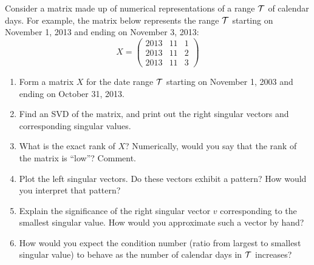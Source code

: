 \documentclass[11pt]{article}
\begin{document}
Consider a matrix made up of numerical representations of a range ${\cal T}$ of calendar days. For example, the matrix below represents the range ${\cal T}$ starting on November 1, 2013 and ending on November 3, 2013:
\[
X = \left(\begin{array}{ccc}
2013 &         11       &     1       \\
        2013      &     11        &    2     \\
        2013      &     11     &       3     \end{array} \right)
\]
\begin{enumerate}
    \item Form a matrix $X$ for the date range ${\cal T}$ starting on November 1, 2003 and ending on October 31, 2013.
    \item Find an SVD of the matrix, and print out the right singular vectors and corresponding singular values.
    \item What is the exact rank of $X$?  Numerically, would you say that the rank of the matrix is ``low''? Comment.
    \item Plot the left singular vectors. Do these vectors exhibit a pattern? How would you interpret that pattern?
    \item Explain the significance of the right singular vector $v$ corresponding to the smallest singular value. How would you approximate such a vector by hand?
    \item How would you expect the condition number (ratio from largest to smallest singular value) to behave as the number of calendar days in ${\cal T}$ increases?
\end{enumerate}

\begin{solution}
\end{solution}
\end{document}
